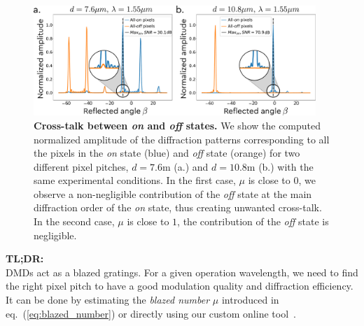 \documentclass[12pt]{iopart}
\begin{document}
\begin{figure}
  \centering
  \includegraphics[width = 0.95\textwidth]{images/xtalk.pdf}
  \caption{
    \textbf{Cross-talk between {\em on} and {\em off} states.}
    We show the computed normalized amplitude of the diffraction patterns corresponding
    to all the pixels in the {\em on} state (blue)
    and {\em off} state (orange)
    for two different pixel pitches,
    $d = 7.6$\textmu m (a.)
    and $d = 10.8$\textmu m (b.)
    with the same experimental conditions.
    In the first case, $\mu$ is close to $0$,
    we observe a non-negligible contribution of the {\em off} state
    at the main diffraction order of the {\em on} state,
    thus creating unwanted cross-talk.
    In the second case, $\mu$ is close to $1$,
    the contribution of the {\em off} state is negligible.
  }
  \label{fig:xtalk}
\end{figure}


\begin{tldr}
  \textbf{TL;DR:}\\
  DMDs act as a blazed gratings.
  For a given operation wavelength,
  we need to find the right pixel pitch
  to have a good modulation quality
  and diffraction efficiency.
  It can be done by estimating the \textit{blazed number} $\mu$ introduced in eq.~(\ref{eq:blazed_number})
  or directly using our custom online tool~\cite{popoffDMDDiffractionTool}.
\end{tldr}






\end{document}

